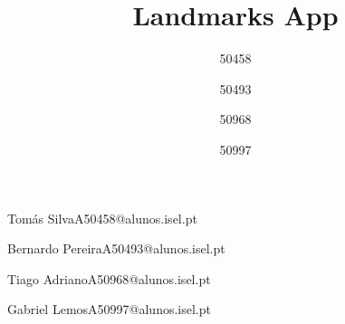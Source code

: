 \def\thetitle{%
 Landmarks App
}
\def\theauthor{%
 [Acrónimo dos alunos]
}

\title{ \thetitle }

\author{50458}{Tomás Silva}{A50458@alunos.isel.pt}
\author{50493}{Bernardo Pereira}{A50493@alunos.isel.pt}
\author{50968}{Tiago Adriano}{A50968@alunos.isel.pt}
\author{50997}{Gabriel Lemos}{A50997@alunos.isel.pt}



